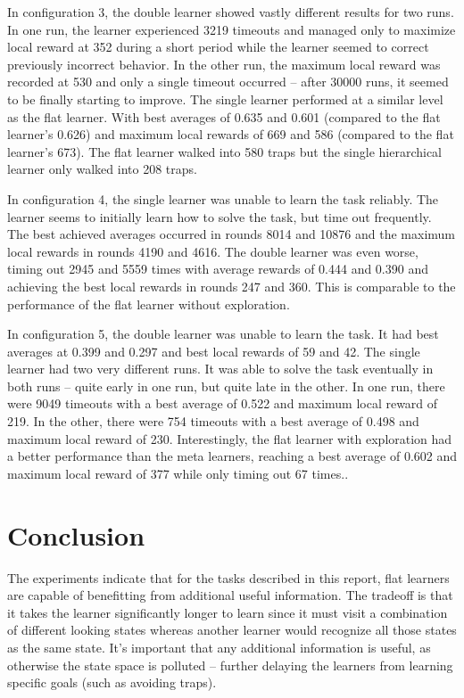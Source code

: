 \documentclass{article}
\begin{document}
	In configuration 3, the double learner showed vastly different results for two runs. In one run, the learner experienced 3219 timeouts and managed only to maximize local reward at 352 during a short period while the learner seemed to correct previously incorrect behavior. In the other run, the maximum local reward was recorded at 530 and only a single timeout occurred -- after 30000 runs, it seemed to be finally starting to improve. 
	The single learner performed at a similar level as the flat learner. With best averages of 0.635 and 0.601 (compared to the flat learner's 0.626) and maximum local rewards of 669 and 586 (compared to the flat learner's 673). The flat learner walked into 580 traps but the single hierarchical learner only walked into 208 traps.

	In configuration 4, the single learner was unable to learn the task reliably. The learner seems to initially learn how to solve the task, but time out frequently. The best achieved averages occurred in rounds 8014 and 10876 and the maximum local rewards in rounds 4190 and 4616.
	The double learner was even worse, timing out 2945 and 5559 times with average rewards of 0.444 and 0.390 and achieving the best local rewards in rounds 247 and 360. This is comparable to the performance of the flat learner without exploration.

	In configuration 5, the double learner was unable to learn the task. It had best averages at 0.399 and 0.297 and best local rewards of 59 and 42. The single learner had two very different runs. It was able to solve the task eventually in both runs -- quite early in one run, but quite late in the other. In one run, there were 9049 timeouts with a best average of 0.522 and maximum local reward of 219. In the other, there were 754 timeouts with a best average of 0.498 and maximum local reward of 230. Interestingly, the flat learner with exploration had a better performance than the meta learners, reaching a best average of 0.602 and maximum local reward of 377 while only timing out 67 times..

	\section{Conclusion}

	The experiments indicate that for the tasks described in this report, flat learners are capable of benefitting from additional useful information. The tradeoff is that it takes the learner significantly longer to learn since it must visit a combination of different looking states whereas another learner would recognize all those states as the same state. It's important that any additional information is useful, as otherwise the state space is polluted -- further delaying the learners from learning specific goals (such as avoiding traps).
	
\end{document}
